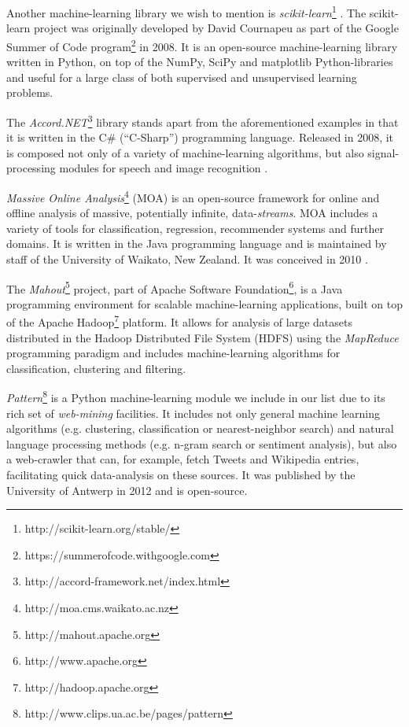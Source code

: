 Another machine-learning library we wish to mention is
\emph{scikit-learn}\footnote{http://scikit-learn.org/stable/} \cite{scikit}. The
scikit-learn project was originally developed by David Cournapeu as part of the
Google Summer of Code program\footnote{https://summerofcode.withgoogle.com} in
2008. It is an open-source machine-learning library written in Python, on top of
the NumPy, SciPy and matplotlib Python-libraries and useful for a large class of
both supervised and unsupervised learning problems.

The \emph{Accord.NET}\footnote{http://accord-framework.net/index.html} library
stands apart from the aforementioned examples in that it is written in the C\#
(``C-Sharp'') programming language. Released in 2008, it is composed not only of
a variety of machine-learning algorithms, but also signal-processing modules for
speech and image recognition \cite{accord}.

\emph{Massive Online Analysis}\footnote{http://moa.cms.waikato.ac.nz} (MOA) is
an open-source framework for online and offline analysis of massive, potentially
infinite, data-\emph{streams}. MOA includes a variety of tools for
classification, regression, recommender systems and further domains. It is
written in the Java programming language and is maintained by staff of the
University of Waikato, New Zealand. It was conceived in 2010 \cite{moa}.

The \emph{Mahout}\footnote{http://mahout.apache.org} project, part of Apache
Software Foundation\footnote{http://www.apache.org}, is a Java programming
environment for scalable machine-learning applications, built on top of the
Apache Hadoop\footnote{http://hadoop.apache.org} platform. It allows for
analysis of large datasets distributed in the Hadoop Distributed File System
(HDFS) using the \emph{MapReduce} programming paradigm and includes
machine-learning algorithms for classification, clustering and filtering.

\emph{Pattern}\footnote{http://www.clips.ua.ac.be/pages/pattern} is a Python
machine-learning module we include in our list due to its rich set of
\emph{web-mining} facilities. It includes not only general machine learning
algorithms (e.g. clustering, classification or nearest-neighbor search) and
natural language processing methods (e.g. n-gram search or sentiment analysis),
but also a web-crawler that can, for example, fetch Tweets and Wikipedia
entries, facilitating quick data-analysis on these sources. It was published by
the University of Antwerp in 2012 and is open-source.

